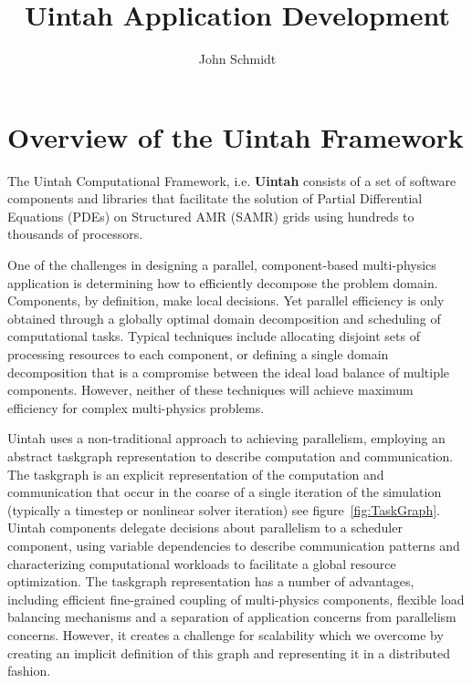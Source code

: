 \documentclass[12pt]{report}
\begin{document}
\title{Uintah Application Development}

\author{John Schmidt}

\maketitle

\tableofcontents

\newpage


\chapter{Overview of the Uintah Framework}

The Uintah Computational Framework, i.e. \textbf{Uintah} consists of a
set of software components and libraries that facilitate the solution
of Partial Differential Equations (PDEs) on Structured AMR (SAMR)
grids using hundreds to thousands of processors.

One of the challenges in designing a parallel, component-based
multi-physics application is determining how to efficiently decompose
the problem domain. Components, by definition, make local
decisions. Yet parallel efficiency is only obtained through a globally
optimal domain decomposition and scheduling of computational
tasks. Typical techniques include allocating disjoint sets of
processing resources to each component, or defining a single domain
decomposition that is a compromise between the ideal load balance of
multiple components. However, neither of these techniques will achieve
maximum efficiency for complex multi-physics problems.

Uintah uses a non-traditional approach to achieving parallelism,
employing an abstract taskgraph representation to describe computation
and communication. The taskgraph is an explicit representation of the
computation and communication that occur in the coarse of a single
iteration of the simulation (typically a timestep or nonlinear solver
iteration) see figure~\ref{fig:TaskGraph}. Uintah components delegate
decisions about parallelism to a scheduler component, using variable
dependencies to describe communication patterns and characterizing
computational workloads to facilitate a global resource
optimization. The taskgraph representation has a number of advantages,
including efficient fine-grained coupling of multi-physics components,
flexible load balancing mechanisms and a separation of application
concerns from parallelism concerns. However, it creates a challenge
for scalability which we overcome by creating an implicit definition
of this graph and representing it in a distributed fashion.
\end{document}
